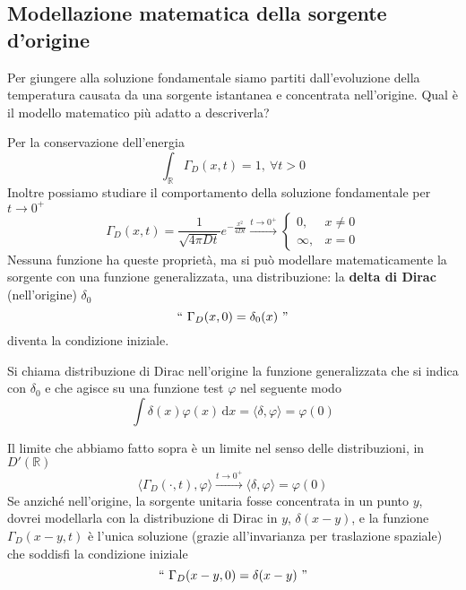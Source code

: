 \documentclass[10pt,a4paper,twoside,openright]{book}
\newcommand{\de}{\,\mathrm d}
\newcommand{\dx}{\de x}
\begin{document}
\subsection{Modellazione matematica della sorgente d'origine}

Per giungere alla soluzione fondamentale siamo partiti dall'evoluzione della temperatura causata da una sorgente istantanea e concentrata nell'origine. Qual è il modello matematico più adatto a descriverla?

Per la conservazione dell'energia
\begin{equation*}
    \int _{\mathbb{R}} \Gamma _{D}(x,t) =1,\ \forall t >0
\end{equation*}
Inoltre possiamo studiare il comportamento della soluzione fondamentale per $\displaystyle t\rightarrow 0^{+}$
\begin{equation*}
    \Gamma _{D}(x,t) =\frac{1}{\sqrt{4\pi Dt}} e^{-\frac{x^{2}}{4Dt}}\xrightarrow{t\rightarrow 0^{+}}
    \begin{cases}
        0,      & x\neq 0 \\
        \infty, & x=0
    \end{cases}
\end{equation*}
Nessuna funzione ha queste proprietà, ma si può modellare matematicamente la sorgente con una funzione generalizzata, una distribuzione: la \textbf{delta di Dirac }(nell'origine) $\displaystyle \delta _{0}$
\begin{equation*}
    ``\ \Gamma _{D}(x,0) =\delta _{0}(x) \ "
\end{equation*}
diventa la condizione iniziale.
\begin{definition}
     Si chiama distribuzione di Dirac nell'origine la funzione generalizzata che si indica con $\displaystyle \delta _{0}$ e che agisce su una funzione test $\displaystyle \varphi $ nel seguente modo
    \begin{equation*}
        \int \delta (x) \varphi (x) \dx=\langle \delta,\varphi \rangle =\varphi (0)
    \end{equation*}
\end{definition}
Il limite che abbiamo fatto sopra è un limite nel senso delle distribuzioni, in $\displaystyle D'(\mathbb{R})$
\begin{equation*}
    \langle \Gamma _{D}(\cdotp,t),\varphi \rangle \xrightarrow{t\rightarrow 0^{+}} \langle \delta,\varphi \rangle =\varphi (0)
\end{equation*}
Se anziché nell'origine, la sorgente unitaria fosse concentrata in un punto $y$, dovrei modellarla con la distribuzione di Dirac in $y$, $\displaystyle \delta (x-y)$, e la funzione $\displaystyle \Gamma _{D}(x-y,t)$ è l'unica soluzione (grazie all'invarianza per traslazione spaziale) che soddisfi la condizione iniziale
\begin{equation*}
    ``\ \Gamma _{D}(x-y,0) =\delta (x-y)\ "
\end{equation*}
\end{document}
